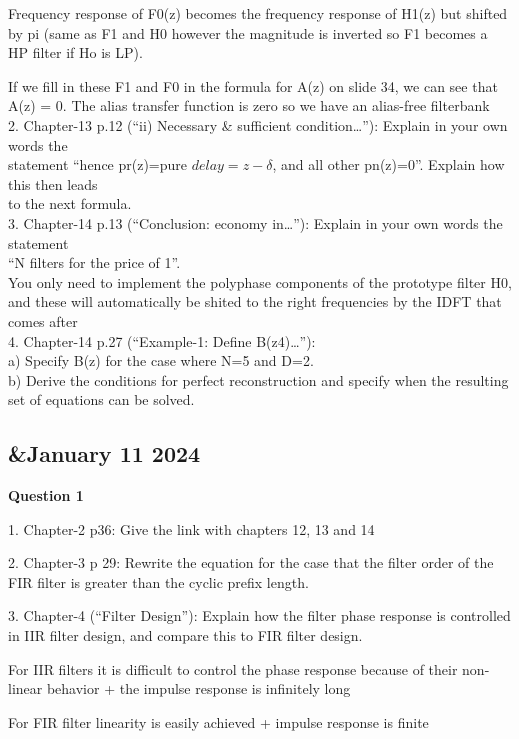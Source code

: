 \documentclass[
  a4paper,
  ,captions=tableheading
]{scrartcl}
\begin{document}
Frequency response of F0(z) becomes the frequency response of H1(z) but
shifted by pi (same as F1 and H0 however the magnitude is inverted so F1
becomes a HP filter if Ho is LP).

If we fill in these F1 and F0 in the formula for A(z) on slide 34, we
can see that A(z) = 0. The alias transfer function is zero so we have an
alias-free filterbank\\
2. Chapter-13 p.12 (``ii) Necessary \& sufficient condition\ldots''):
Explain in your own words the\\
statement ``hence pr(z)=pure \(delay=z-\delta\), and all other
pn(z)=0''. Explain how this then leads\\
to the next formula.\\
3. Chapter-14 p.13 (``Conclusion: economy in\ldots''): Explain in your
own words the statement\\
``N filters for the price of 1''.\\
You only need to implement the polyphase components of the prototype
filter H0, and these will automatically be shited to the right
frequencies by the IDFT that comes after\\
4. Chapter-14 p.27 (``Example-1: Define B(z4)\ldots''):\\
a) Specify B(z) for the case where N=5 and D=2.\\
b) Derive the conditions for perfect reconstruction and specify when the
resulting set of equations can be solved.

\subsection{\&January 11 2024}\label{january-11-2024-1}

\textbf{Question 1}

1. Chapter-2 p36: Give the link with chapters 12, 13 and 14

2. Chapter-3 p 29: Rewrite the equation for the case that the filter
order of the FIR filter is greater than the cyclic prefix length.

3. Chapter-4 (``Filter Design''): Explain how the filter phase response
is controlled in IIR filter design, and compare this to FIR filter
design.

For IIR filters it is difficult to control the phase response because of
their non-linear behavior + the impulse response is infinitely long

For FIR filter linearity is easily achieved + impulse response is finite
\end{document}
